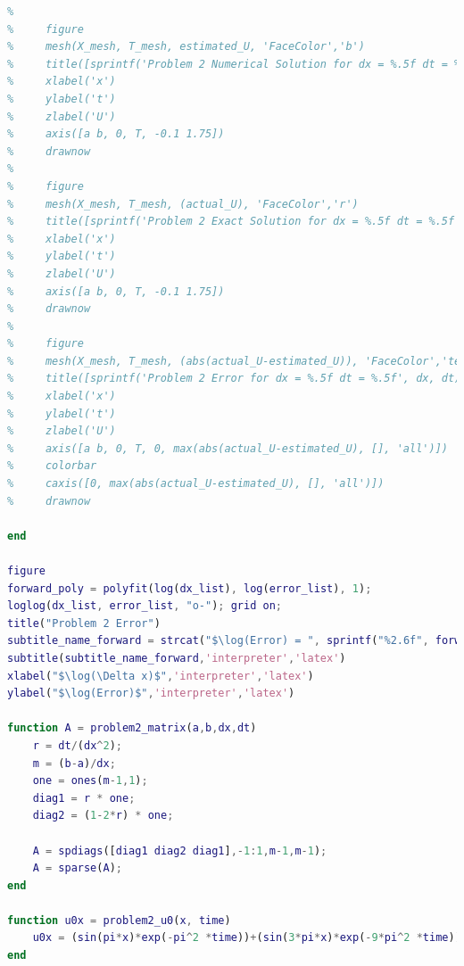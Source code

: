 \documentclass[12pt,letterpaper]{article}
\begin{document}
\begin{lstlisting}[language = Matlab]
%     [X_mesh, T_mesh] = meshgrid([a:dx:b] , [0:dt:T]);
% 
%     figure
%     mesh(X_mesh, T_mesh, estimated_U, 'FaceColor','b')
%     title([sprintf('Problem 2 Numerical Solution for dx = %.5f dt = %.5f', dx, dt)])
%     xlabel('x')
%     ylabel('t')
%     zlabel('U')
%     axis([a b, 0, T, -0.1 1.75])
%     drawnow
%     
%     figure
%     mesh(X_mesh, T_mesh, (actual_U), 'FaceColor','r')
%     title([sprintf('Problem 2 Exact Solution for dx = %.5f dt = %.5f', dx, dt)])
%     xlabel('x')
%     ylabel('t')
%     zlabel('U')
%     axis([a b, 0, T, -0.1 1.75])
%     drawnow
%     
%     figure
%     mesh(X_mesh, T_mesh, (abs(actual_U-estimated_U)), 'FaceColor','texturemap', 'EdgeColor', "none")
%     title([sprintf('Problem 2 Error for dx = %.5f dt = %.5f', dx, dt)])
%     xlabel('x')
%     ylabel('t')
%     zlabel('U')
%     axis([a b, 0, T, 0, max(abs(actual_U-estimated_U), [], 'all')])
%     colorbar
%     caxis([0, max(abs(actual_U-estimated_U), [], 'all')])
%     drawnow

end

figure
forward_poly = polyfit(log(dx_list), log(error_list), 1);
loglog(dx_list, error_list, "o-"); grid on;
title("Problem 2 Error")
subtitle_name_forward = strcat("$\log(Error) = ", sprintf("%2.6f", forward_poly(1)), "\log(\Delta x) + ", sprintf("%2.6f", forward_poly(2)), "$");
subtitle(subtitle_name_forward,'interpreter','latex')
xlabel("$\log(\Delta x)$",'interpreter','latex')
ylabel("$\log(Error)$",'interpreter','latex')

function A = problem2_matrix(a,b,dx,dt)
    r = dt/(dx^2);
    m = (b-a)/dx;
    one = ones(m-1,1);
    diag1 = r * one;
    diag2 = (1-2*r) * one;

    A = spdiags([diag1 diag2 diag1],-1:1,m-1,m-1);
    A = sparse(A);
end

function u0x = problem2_u0(x, time)
    u0x = (sin(pi*x)*exp(-pi^2 *time))+(sin(3*pi*x)*exp(-9*pi^2 *time));
end
\end{lstlisting}
\end{document}
